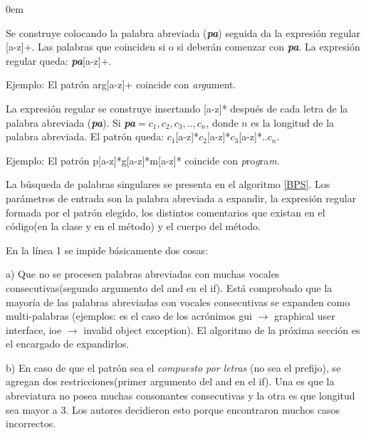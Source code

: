 \documentclass[a4paper,12pt]{report}
\begin{document}
\begin{description}
\itemsep0em%
\item[Patrón prefijo:] Se construye colocando la palabra abreviada (\textit{\textbf{pa}}) seguida da la expresión regular [a-z]+. Las palabras que coinciden si o si deberán comenzar con \textit{\textbf{pa}}. La expresión regular queda: \textit{\textbf{pa}}[a-z]+.

Ejemplo: El patrón \textsf{arg}[a-z]+ coincide con \textsf{\textit{arg}}ument.

\item[Patrón compuesto por letras:]  La expresión regular se construye insertando [a-z]* después de cada letra de la palabra abreviada (\textit{\textbf{pa}}). Si \textit{\textbf{pa}}$=c_{1},c_{2},c_{3},..,c_{n}$, donde $n$ es la longitud de la palabra abreviada. El patrón queda: $c_{1}$[a-z]*$c_{2}$[a-z]*$c_{3}$[a-z]*..$c_{n}$.

Ejemplo: El patrón \textsf{p}[a-z]*\textsf{g}[a-z]*\textsf{m}[a-z]* coincide con \textsf{\textit{p}}ro\textsf{\textit{g}}ra\textsf{\textit{m}}.
\end{description}



La búsqueda de palabras singulares se presenta en el algoritmo \ref{BPS}. Los parámetros de entrada son la palabra abreviada a expandir, la expresión regular formada por el patrón elegido, los distintos comentarios que existan en el código(en la clase y en el método) y el cuerpo del método.

En la línea 1 se impide básicamente dos cosas: 

a) Que no se procesen palabras abreviadas con muchas vocales consecutivas(segundo argumento del \textsf{and} en el \textsf{if}). Está comprobado que la mayoría de las palabras abreviadas con vocales consecutivas se expanden como multi-palabras (ejemplos: es el caso de los acrónimos \textsf{gui} $\rightarrow$ \textsf{graphical user interface}, \textsf{ioe} $\rightarrow$ \textsf{invalid object exception}). El algoritmo de la próxima sección es el encargado de expandirlos.

b) En caso de que el patrón sea el \textit{compuesto por letras} (no sea el prefijo), se agregan dos restricciones(primer argumento del \textsf{and} en el \textsf{if}). Una es que la abreviatura no posea muchas consonantes consecutivas y la otra es que longitud sea mayor a 3. Los autores decidieron esto porque encontraron muchos casos incorrectos\cite{EZH08}.
\end{document}
